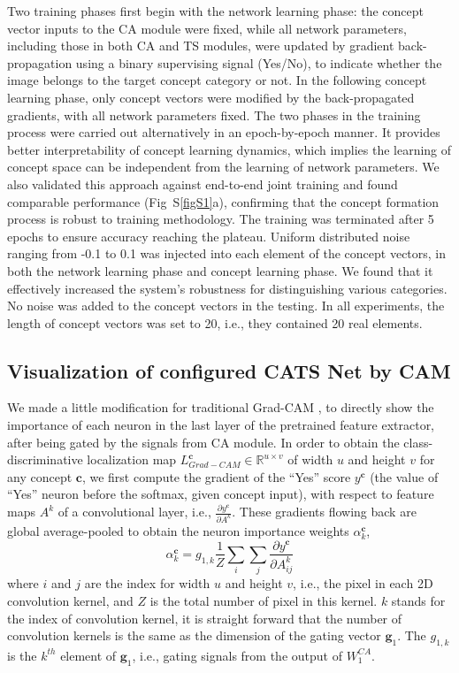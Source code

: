 \documentclass[pdflatex,sn-mathphys-num,lineno]{sn-jnl}%
\begin{document}
\begin{CJK}{UTF8}{gbsn}
Two training phases first begin with the network learning phase: the concept vector inputs to the CA module were fixed, while all network parameters, including those in both CA and TS modules, were updated by gradient back-propagation using a binary supervising signal (Yes/No), to indicate whether the image belongs to the target concept category or not. In the following concept learning phase, only concept vectors were modified by the back-propagated gradients, with all network parameters fixed. The two phases in the training process were carried out alternatively in an epoch-by-epoch manner. It provides better interpretability of concept learning dynamics, which implies the learning of concept space can be independent from the learning of network parameters. We also validated this approach against end-to-end joint training and found comparable performance (Fig~S\ref{figS1}a), confirming that the concept formation process is robust to training methodology. The training was terminated after 5 epochs to ensure accuracy reaching the plateau. Uniform distributed noise ranging from -0.1 to 0.1 was injected into each element of the concept vectors, in both the network learning phase and concept learning phase. We found that it effectively increased the system’s robustness for distinguishing various categories. No noise was added to the concept vectors in the testing. In all experiments, the length of concept vectors was set to 20, i.e., they contained 20 real elements.

\subsection{Visualization of configured CATS Net by CAM}
We made a little modification for traditional Grad-CAM \cite{selvaraju_grad-cam_2017}, to directly show the importance of each neuron in the last layer of the pretrained feature extractor, after being gated by the signals from CA module. In order to obtain the class-discriminative localization map $L_{Grad-CAM}^{\mathbf{c}} \in \mathbb{R}^{u \times v}$ of width $u$ and height $v$ for any concept $\mathbf{c}$, we first compute the gradient of the “Yes” score $y^\mathbf{c}$ (the value of “Yes” neuron before the softmax, given concept input), with respect to feature maps $A^k$ of a convolutional layer, i.e., $\frac{\partial y^\mathbf{c}}{\partial A^k}$. These gradients flowing back are global average-pooled to obtain the neuron importance weights $\alpha_k^\mathbf{c}$,
\[
\alpha_k^\mathbf{c} = g_{1, k} \frac{1}{Z} \sum_i \sum_j \frac{\partial y^\mathbf{c}}{\partial A^k_{ij}}
\]
where $i$ and $j$ are the index for width $u$ and height $v$, i.e., the pixel in each 2D convolution kernel, and $Z$ is the total number of pixel in this kernel. $k$ stands for the index of convolution kernel, it is straight forward that the number of convolution kernels is the same as the dimension of the gating vector $\mathbf{g}_1$. The $g_{1, k}$ is the $k^{th}$ element of $\mathbf{g}_1$, i.e., gating signals from the output of $W_1^{CA}$. 


\end{CJK}
\end{document}
